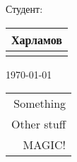 \documentclass{article}
\makeatletter
\newcommand{\handplaceholder}[3]{
    \bgroup
      \renewcommand*{\arraystretch}{0}
      \begin{tabular}{@{}>{\centering\arraybackslash}p{#1}@{}}
        #2 \\
        \hline
        {\scriptsize #3}
      \end{tabular}
    \egroup
  }
\newcounter{magicrownumbers}
\newcommand\rownumber{\stepcounter{magicrownumbers}\arabic{magicrownumbers}}
\makeatother
\begin{document}
%                                                                
  Студент: \handplaceholder{3cm}{Харламов}{Фамилия} \hfill \today

%                                                                        
  \begin{tabular}{@{\makebox[3em][r]{\rownumber\space}} | r}
    Something \\
    Other stuff \\
    MAGIC!
  \end{tabular}


\end{document}
